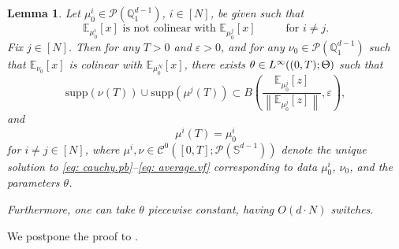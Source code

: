 \documentclass[a4paper,11pt]{article}
\theoremstyle{plain}
\newtheorem{lemma}[theorem]{Lemma}
\newcommand{\supp}{\mathrm{supp}}
\renewcommand{\S}{\mathbb{S}^{d-1}}
\newcommand{\Q}{\mathbb{Q}}
\numberwithin{equation}{section}
\begin{document}
\begin{lemma} \label{lem: induction.barycenter} 
Let $\mu_0^i\in\mathscr{P}(\Q_1^{d-1})$, $i\in[N]$, be given such that
    \begin{equation*}
        \mathbb{E}_{\mu_0^i}[x] \text{ is not colinear with }\mathbb{E}_{\mu_0^j}[x] \hspace{1cm} \text{ for } i\neq j.
    \end{equation*}
    Fix $j\in[N]$.
    Then for any $T>0$ and $\varepsilon>0$, and for any $\nu_0\in \mathscr{P}(\Q_1^{d-1})$ such that $\mathbb{E}_{\nu_0}[x]$ is colinear with $\mathbb{E}_{\mu_0^N}[x]$, there exists $\theta\in L^\infty((0,T);\Uptheta)$ such that 
    \begin{equation*}
        \supp(\nu(T))\cup\supp(\mu^j(T))\subset B\left( \frac{\mathbb{E}_{\mu^j_0}[z]}{\left\|\mathbb{E}_{\mu^j_0}[z]\right\|},\varepsilon\right),
    \end{equation*}
    and
    \begin{equation*}
        \mu^i(T)=\mu^i_0
    \end{equation*}
    for $i\neq j\in[N]$, where $\mu^i, \nu \in \mathscr{C}^0([0,T];\mathscr{P}(\S))$ 
    denote the unique solution to \eqref{eq: cauchy.pb}--\eqref{eq: average.vf} corresponding to data $\mu_0^i$, $\nu_0$, and the parameters $\theta$.

Furthermore, one can take $\theta$ piecewise constant, having  $O(d\cdot N)$ switches.
\end{lemma}

We postpone the proof to {\bf {}}.
\end{document}
